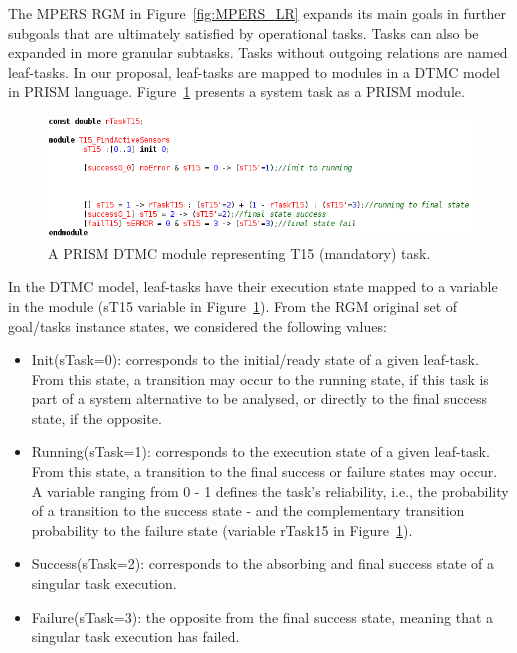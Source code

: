 The MPERS RGM in Figure~\ref{fig:MPERS_LR} expands its main goals in further subgoals that are ultimately satisfied by operational tasks. Tasks can also be expanded in more granular subtasks. Tasks without outgoing relations are named leaf-tasks. In our proposal, leaf-tasks are mapped to modules in a DTMC model in PRISM language. Figure~\ref{fig:PRISM_TSK_MODULE} presents a system task as a PRISM module.


\begin{figure}[ht]
\centering
\includegraphics[width=1\textwidth]{imgs/PRISM_TSK_MODULE.png}
\caption{A PRISM DTMC module representing T15 (mandatory) task.}
\label{fig:PRISM_TSK_MODULE}
\end{figure}

In the DTMC model, leaf-tasks have their execution state mapped to a variable in the module (sT15 variable in Figure~\ref{fig:PRISM_TSK_MODULE}). From the RGM original set of goal/tasks instance states, we considered the following values:

\begin{itemize}

\item Init(sTask=0): corresponds to the initial/ready state of a given leaf-task. From this state, a transition may occur to the running state, if this task is part of a system alternative to be analysed, or directly to the final success state, if the opposite.
\medskip

\item Running(sTask=1): corresponds to the execution state of a given leaf-task. From this state, a transition to the final success or failure states may occur. A variable ranging from 0 - 1 defines the task's reliability, i.e., the probability of a transition to the success state - and the complementary transition probability to the failure state (variable rTask15 in Figure~\ref{fig:PRISM_TSK_MODULE}).
\medskip

\item Success(sTask=2): corresponds to the absorbing and final success state of a singular task execution.
\medskip

\item Failure(sTask=3): the opposite from the final success state, meaning that a singular task execution has failed.

\end{itemize}


